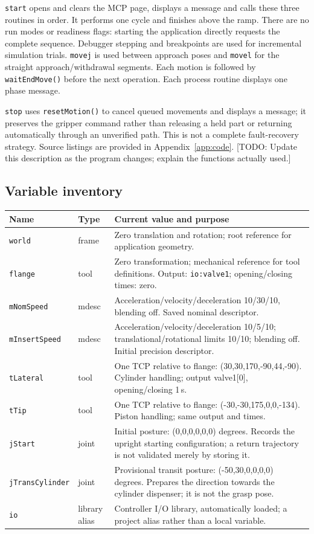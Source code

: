 \documentclass[12pt]{article}
\newcommand{\pending}[1]{\textcolor{blue!65!black}{[TODO: #1]}}
\begin{document}
\texttt{start} opens and clears the MCP page, displays a message and calls these three routines in order. It performs one cycle and finishes above the ramp. There are no run modes or readiness flags: starting the application directly requests the complete sequence. Debugger stepping and breakpoints are used for incremental simulation trials. \texttt{movej} is used between approach poses and \texttt{movel} for the straight approach/withdrawal segments. Each motion is followed by \texttt{waitEndMove()} before the next operation. Each process routine displays one phase message.

\texttt{stop} uses \texttt{resetMotion()} to cancel queued movements and displays a message; it preserves the gripper command rather than releasing a held part or returning automatically through an unverified path. This is not a complete fault-recovery strategy. Source listings are provided in Appendix~\ref{app:code}.
\pending{Update this description as the program changes; explain the functions actually used.}

\subsection{Variable inventory}
\begin{tabularx}{\linewidth}{@{}l l X@{}}
\toprule
Name & Type & Current value and purpose\\
\midrule
\texttt{world} & frame & Zero translation and rotation; root reference for application geometry.\\
\texttt{flange} & tool & Zero transformation; mechanical reference for tool definitions. Output: \texttt{io:valve1}; opening/closing times: zero.\\
\texttt{mNomSpeed} & mdesc & Acceleration/velocity/deceleration 10/30/10, blending off. Saved nominal descriptor.\\
\texttt{mInsertSpeed} & mdesc & Acceleration/velocity/deceleration 10/5/10; translational/rotational limits 10/10; blending off. Initial precision descriptor.\\
\texttt{tLateral} & tool & One TCP relative to flange: (30,30,170,-90,44,-90). Cylinder handling; output valve1[0], opening/closing 1\,s.\\
\texttt{tTip} & tool & One TCP relative to flange: (-30,-30,175,0,0,-134). Piston handling; same output and times.\\
\texttt{jStart} & joint & Initial posture: (0,0,0,0,0,0) degrees. Records the upright starting configuration; a return trajectory is not validated merely by storing it.\\
\texttt{jTransCylinder} & joint & Provisional transit posture: (-50,30,0,0,0,0) degrees. Prepares the direction towards the cylinder dispenser; it is not the grasp pose.\\
\texttt{io} & library alias & Controller I/O library, automatically loaded; a project alias rather than a local variable.\\
\bottomrule
\end{tabularx}
\end{document}
